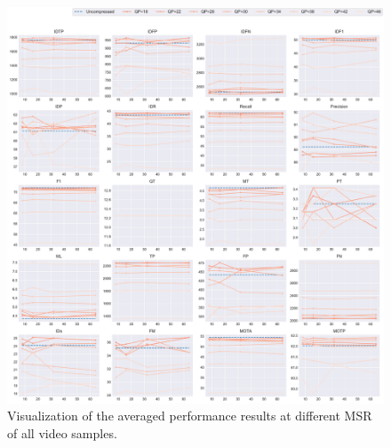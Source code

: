 \begin{figure}[!htbp]
  \centering
  \includegraphics[width=1.0\linewidth]{img/averaged_all_multiplots_msr.pdf}
  \caption[Visualization of the averaged performance results at different MSR of all video samples]
  {Visualization of the averaged performance results at different MSR of all video samples.}
  \label{fig:averaged_result_all_multiplots_msr}
\end{figure}